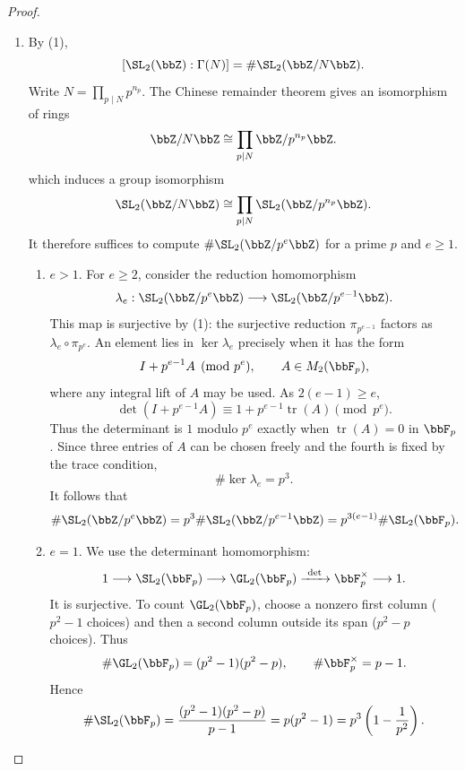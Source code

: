 \begin{proof}
\begin{enumerate}[label=(\arabic*)]
        Consequently $S \cap \SL_2(\bbZ) \ne \varnothing$, so $\pi_N$ is surjective. Its kernel is $\Gamma(N)$ by definition; the first isomorphism theorem gives
        \[
            \SL_2(\bbZ)/\Gamma(N) \cong \SL_2(\bbZ/N\bbZ).
        \]

        \item By (1),
        \[
            [\SL_2(\bbZ) : \Gamma(N)] = \#\SL_2(\bbZ/N\bbZ).
        \]
        Write $N = \prod_{p \mid N}p^{n_p}$. The Chinese remainder theorem gives an isomorphism of rings
        \[
            \bbZ/N\bbZ \cong \prod_{p \mid N}\bbZ/p^{n_p}\bbZ.
        \]
        which induces a group isomorphism
        \[
            \SL_2(\bbZ/N\bbZ) \cong
            \prod_{p \mid N}\SL_2(\bbZ/p^{n_p}\bbZ).
        \]
        It therefore suffices to compute $\#\SL_2(\bbZ/p^e\bbZ)$ for a prime $p$ and $e \ge 1$.

        \begin{enumerate}[label=\textbf{Case~\arabic*}]
            \item $e > 1$.
            For $e \ge 2$, consider the reduction homomorphism
            \[
                \lambda_e : \SL_2(\bbZ/p^e\bbZ)
                \longrightarrow \SL_2(\bbZ/p^{e - 1}\bbZ).
            \]
            This map is surjective by (1): the surjective reduction $\pi_{p^{e - 1}}$ factors as $\lambda_e \circ \pi_{p^e}$. An element lies in $\ker\lambda_e$ precisely when it has the form
            \[
                I + p^{e - 1}A\pmod{p^e}, \qquad A \in M_2(\bbF_p),
            \]
            where any integral lift of $A$ may be used. As $2(e - 1) \ge e$,
            \[
                \det(I + p^{e - 1}A)
                \equiv 1 + p^{e - 1}\operatorname{tr}(A)\pmod{p^e}.
            \]
            Thus the determinant is $1$ modulo $p^e$ exactly when $\operatorname{tr}(A) = 0$ in $\bbF_p$. Since three entries of $A$ can be chosen freely and the fourth is fixed by the trace condition,
            \[
                \#\ker\lambda_e = p^3.
            \]
            It follows that
            \[
                \#\SL_2(\bbZ/p^e\bbZ)
                = p^3\#\SL_2(\bbZ/p^{e - 1}\bbZ)
                = p^{3(e - 1)}\#\SL_2(\bbF_p).
            \]

            \item $e = 1$.
            We use the determinant homomorphism:
            \[
                1 \longrightarrow \SL_2(\bbF_p)
                \longrightarrow \GL_2(\bbF_p)
                \xrightarrow{\ \det\ }\bbF_p^\times
                \longrightarrow 1.
            \]
            It is surjective. To count $\GL_2(\bbF_p)$, choose a nonzero first column ($p^2 - 1$ choices) and then a second column outside its span ($p^2 - p$ choices). Thus
            \[
                \#\GL_2(\bbF_p) = (p^2 - 1)(p^2 - p),
                \qquad \#\bbF_p^\times = p - 1.
            \]
            Hence
            \[
                \#\SL_2(\bbF_p)
                = \frac{(p^2 - 1)(p^2 - p)}{p - 1}
                = p(p^2 - 1)
                = p^3\left(1 - \frac1{p^2}\right).
            \]
        \end{enumerate}


\end{enumerate}
\end{proof}
